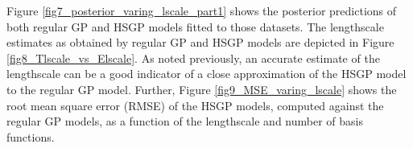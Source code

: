 \documentclass[]{interact}
\theoremstyle{plain}%
\theoremstyle{definition}
\theoremstyle{remark}
\begin{document}
Figure \ref{fig7_posterior_varing_lscale_part1} shows the posterior predictions of both regular GP and HSGP models fitted to those datasets. The lengthscale estimates as obtained by regular GP and HSGP models are depicted in Figure \ref{fig8_Tlscale_vs_Elscale}. As noted previously, an accurate estimate of the lengthscale can be a good indicator of a close approximation of the HSGP model to the regular GP model. Further, Figure \ref{fig9_MSE_varing_lscale} shows the root mean square error (RMSE) of the HSGP models, computed against the regular GP models, as a function of the lengthscale and number of basis functions.

\begin{figure}
\centering
{}\\
\vspace{-3mm}

\end{figure}
\end{document}
